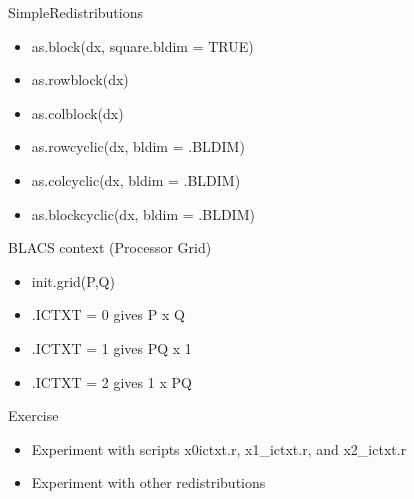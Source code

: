\begin{frame}
  \begin{block}{SimpleRedistributions}\pause
  \begin{itemize}
\item as.block(dx, square.bldim = TRUE)
\item as.rowblock(dx)
\item as.colblock(dx)
\item as.rowcyclic(dx, bldim = .BLDIM)
\item as.colcyclic(dx, bldim = .BLDIM)
\item as.blockcyclic(dx, bldim = .BLDIM)
  \end{itemize}
  \end{block}
  \begin{block}{BLACS context (Processor Grid)}\pause
  \begin{itemize}
\item init.grid(P,Q)
\item .ICTXT = 0 gives P x Q 
\item .ICTXT = 1 gives PQ x 1
\item .ICTXT = 2 gives 1 x PQ
  \end{itemize}
  \end{block}
\end{frame}

\begin{frame}
  \begin{block}{Exercise}\pause
  \begin{itemize}
  \item Experiment with scripts x0\-ictxt.r, x1\_ictxt.r, and x2\_ictxt.r
  \item Experiment with other redistributions
  \end{itemize}
  \end{block}
\end{frame}

